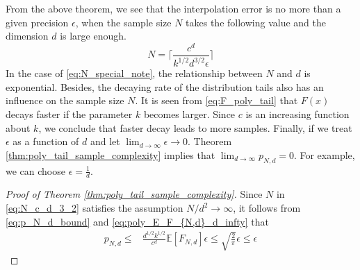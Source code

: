 \documentclass[conference,a4paper]{IEEEtran}
\def\E{\mathbb{E}}
\begin{document}
From the above theorem, we see that the interpolation error is no more than a given precision $\epsilon$,
when the sample size $N$ takes the following value
and the dimension $d$ is large enough.
\begin{equation}\label{eq:N_special_note}
   N = \Big\lceil \frac{c^d}{k^{1/2}d^{3/2} \epsilon} \Big\rceil
\end{equation}
In the case of \eqref{eq:N_special_note}, the relationship between $N$ and $d$ is exponential.
Besides, the decaying rate of the distribution tails also has an influence on the sample size $N$.
It is seen from \eqref{eq:F_poly_tail} that $F(x)$ decays faster if the parameter $k$
becomes larger.
Since $c$ is an increasing function about $k$,
we conclude that faster decay leads to more samples.
Finally, if we treat $\epsilon$ as a function of $d$ and let $\lim_{d\to\infty}\epsilon \to 0$.
Theorem \ref{thm:poly_tail_sample_complexity} implies that $\lim_{d\to\infty} p_{N,d} = 0$.
For example, we can choose $\epsilon=\frac{1}{d}$.

\begin{proof}[Proof of Theorem \ref{thm:poly_tail_sample_complexity}]

Since $N$ in \eqref{eq:N_c_d_3_2} satisfies the assumption $N/d^2 \to \infty$,
it follows from \eqref{eq:p_N_d_bound} and \eqref{eq:poly_E_F_{N,d}_d_infty} that
\begin{align*}
p_{N,d} \leq &\frac{d^{1/2}k^{1/2}}{c^d} \E[F_{N,d}]\epsilon
\leq \sqrt{\frac{2}{\pi}}\epsilon \leq \epsilon
\end{align*}
\end{proof}
\end{document}
